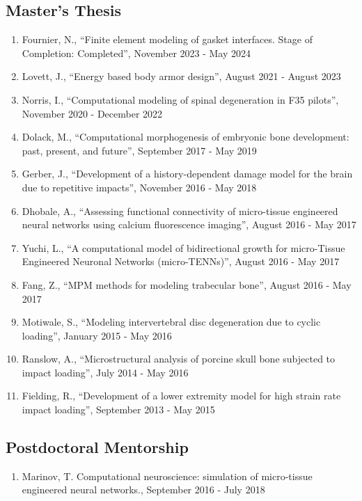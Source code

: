 \documentclass[a4paper,10pt]{article}
\begin{document}
\subsection*{Master’s Thesis}
\begin{enumerate}
\item Fournier, N., ``Finite element modeling of gasket interfaces. Stage of Completion: Completed'', November 2023 - May 2024
\item Lovett, J., ``Energy based body armor design'', August 2021 - August 2023
\item Norris, I., ``Computational modeling of spinal degeneration in F35 pilots'', November 2020 - December 2022
\item Dolack, M., ``Computational morphogenesis of embryonic bone development: past, present, and future'', September 2017 - May 2019
\item Gerber, J., ``Development of a history-dependent damage model for the brain due to repetitive impacts'', November 2016 - May 2018
\item Dhobale, A., ``Assessing functional connectivity of micro-tissue engineered neural networks using calcium fluorescence imaging'', August 2016 - May 2017
\item Yuchi, L., ``A computational model of bidirectional growth for micro-Tissue Engineered Neuronal Networks (micro-TENNs)'', August 2016 - May 2017
\item Fang, Z., ``MPM methods for modeling trabecular bone'', August 2016 - May 2017
\item Motiwale, S., ``Modeling intervertebral disc degeneration due to cyclic loading'', January 2015 - May 2016
\item Ranslow, A., ``Microstructural analysis of porcine skull bone subjected to impact loading'', July 2014 - May 2016
\item Fielding, R., ``Development of a lower extremity model for high strain rate impact loading'', September 2013 - May 2015
\end{enumerate}

\subsection*{Postdoctoral Mentorship}
\begin{enumerate}
\item Marinov, T. Computational neuroscience: simulation of micro-tissue engineered neural networks., September 2016 - July 2018
\end{enumerate}
\end{document}
